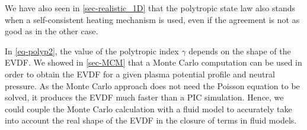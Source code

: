 We have also seen in \cref{sec-realistic_1D} that the polytropic state law also stands when a self-consistent heating mechanism is used, even if the agreement is not as good as in the other case.

In \cref{eq-polyp2}, the value of the polytropic index $\gamma$ depends on the shape of the \ac{EVDF}.
We showed in \cref{sec-MCM} that a Monte Carlo computation can be used in order to obtain the \ac{EVDF} for a given plasma potential profile and neutral pressure.
As the Monte Carlo approach does not need the Poisson equation to be solved, it produces the \ac{EVDF} much faster than a \ac{PIC} simulation.
Hence, we could couple the Monte Carlo calculation with a fluid model to accurately take into account the real shape of the \ac{EVDF} in the closure of terms in fluid models.

